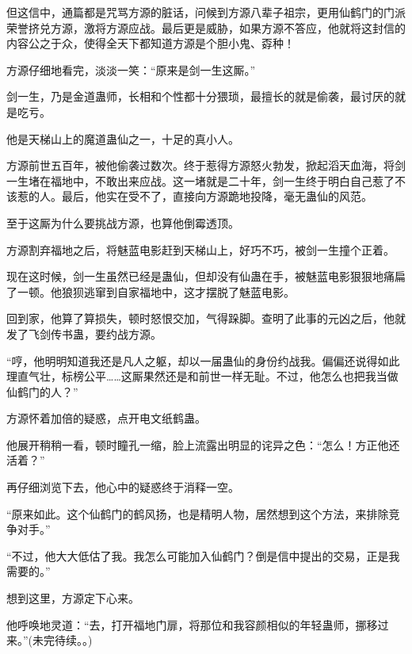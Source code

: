 \begin{this_body}
但这信中，通篇都是咒骂方源的脏话，问候到方源八辈子祖宗，更用仙鹤门的门派荣誉挤兑方源，激将方源应战。最后更是威胁，如果方源不答应，他就将这封信的内容公之于众，使得全天下都知道方源是个胆小鬼、孬种！

方源仔细地看完，淡淡一笑：“原来是剑一生这厮。”

剑一生，乃是金道蛊师，长相和个性都十分猥琐，最擅长的就是偷袭，最讨厌的就是吃亏。

他是天梯山上的魔道蛊仙之一，十足的真小人。

方源前世五百年，被他偷袭过数次。终于惹得方源怒火勃发，掀起滔天血海，将剑一生堵在福地中，不敢出来应战。这一堵就是二十年，剑一生终于明白自己惹了不该惹的人。最后，他实在受不了，直接向方源跪地投降，毫无蛊仙的风范。

至于这厮为什么要挑战方源，也算他倒霉透顶。

方源割弃福地之后，将魅蓝电影赶到天梯山上，好巧不巧，被剑一生撞个正着。

现在这时候，剑一生虽然已经是蛊仙，但却没有仙蛊在手，被魅蓝电影狠狠地痛扁了一顿。他狼狈逃窜到自家福地中，这才摆脱了魅蓝电影。

回到家，他算了算损失，顿时怒恨交加，气得跺脚。查明了此事的元凶之后，他就发了飞剑传书蛊，要约战方源。

“哼，他明明知道我还是凡人之躯，却以一届蛊仙的身份约战我。偏偏还说得如此理直气壮，标榜公平……这厮果然还是和前世一样无耻。不过，他怎么也把我当做仙鹤门的人？”

方源怀着加倍的疑惑，点开电文纸鹤蛊。

他展开稍稍一看，顿时瞳孔一缩，脸上流露出明显的诧异之色：“怎么！方正他还活着？”

再仔细浏览下去，他心中的疑惑终于消释一空。

“原来如此。这个仙鹤门的鹤风扬，也是精明人物，居然想到这个方法，来排除竞争对手。”

“不过，他大大低估了我。我怎么可能加入仙鹤门？倒是信中提出的交易，正是我需要的。”

想到这里，方源定下心来。

他呼唤地灵道：“去，打开福地门扉，将那位和我容颜相似的年轻蛊师，挪移过来。”(未完待续。。)

\end{this_body}

